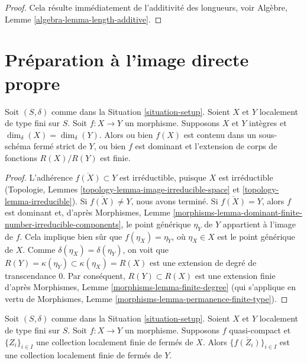 \begin{proof}
Cela résulte immédiatement de l'additivité des longueurs, voir
Algèbre, Lemme \ref{algebra-lemma-length-additive}.
\end{proof}









\section{Préparation à l'image directe propre}
\label{section-preparation-pushforward}

\begin{lemma}
\label{lemma-equal-dimension}
Soit $(S, \delta)$ comme dans la Situation \ref{situation-setup}.
Soient $X$ et $Y$ localement de type fini sur $S$.
Soit $f : X \to Y$ un morphisme.
Supposons $X$ et $Y$ intègres et $\dim_\delta(X) = \dim_\delta(Y)$.
Alors ou bien $f(X)$ est contenu dans un sous-schéma fermé strict
de $Y$, ou bien $f$ est dominant et l'extension de corps de fonctions
$R(X)/R(Y)$ est finie.
\end{lemma}

\begin{proof}
L'adhérence $\overline{f(X)} \subset Y$ est irréductible, puisque $X$
est irréductible (Topologie, Lemmes
\ref{topology-lemma-image-irreducible-space} et
\ref{topology-lemma-irreducible}).
Si $\overline{f(X)} \not = Y$, nous avons terminé.
Si $\overline{f(X)} = Y$, alors $f$ est dominant et, d'après
Morphismes,
Lemme \ref{morphisms-lemma-dominant-finite-number-irreducible-components},
le point générique $\eta_Y$ de $Y$ appartient à l'image de $f$.
Cela implique bien sûr que $f(\eta_X) = \eta_Y$, où $\eta_X \in X$
est le point générique de $X$. Comme $\delta(\eta_X) = \delta(\eta_Y)$,
on voit que $R(Y) = \kappa(\eta_Y) \subset \kappa(\eta_X) = R(X)$
est une extension de degré de transcendance $0$.
Par conséquent, $R(Y) \subset R(X)$ est une extension finie d'après
Morphismes, Lemme \ref{morphisms-lemma-finite-degree}
(qui s'applique en vertu de
Morphismes, Lemme \ref{morphisms-lemma-permanence-finite-type}).
\end{proof}

\begin{lemma}
\label{lemma-quasi-compact-locally-finite}
Soit $(S, \delta)$ comme dans la Situation \ref{situation-setup}.
Soient $X$ et $Y$ localement de type fini sur $S$.
Soit $f : X \to Y$ un morphisme.
Supposons $f$ quasi-compact et $\{Z_i\}_{i \in I}$ une collection localement
finie de fermés de $X$.
Alors $\{\overline{f(Z_i)}\}_{i \in I}$ est une collection localement finie
de fermés de $Y$.
\end{lemma}

